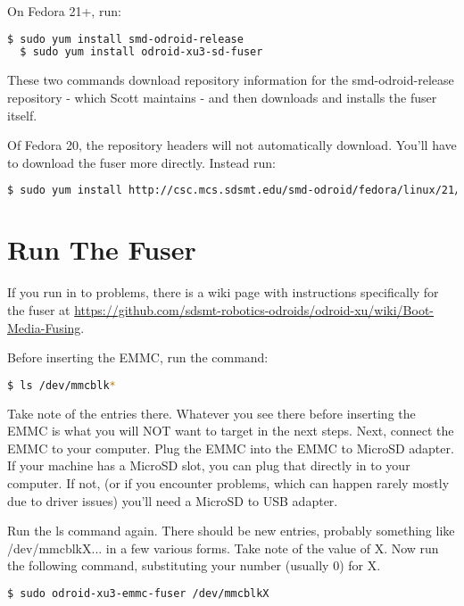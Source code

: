 On Fedora 21+, run:
\begin{lstlisting}[language=bash]
  $ sudo yum install smd-odroid-release
  $ sudo yum install odroid-xu3-sd-fuser
\end{lstlisting}

These two commands download repository information for the smd-odroid-release repository - which Scott maintains - and then downloads and installs the fuser itself.

Of Fedora 20, the repository headers will not automatically download. You'll have to download the fuser more directly. Instead run:

\begin{lstlisting}[language=bash]
  $ sudo yum install http://csc.mcs.sdsmt.edu/smd-odroid/fedora/linux/21/x86_64/odroid-xu3-sd-fuser-0.2.0-1.fc21.noarch.rpm
\end{lstlisting}

\section{Run The Fuser}

If you run in to problems, there is a wiki page with instructions specifically for the fuser at \url{https://github.com/sdsmt-robotics-odroids/odroid-xu/wiki/Boot-Media-Fusing}.

Before inserting the EMMC, run the command:

\begin{lstlisting}[language=bash]
  $ ls /dev/mmcblk*
\end{lstlisting}

Take note of the entries there. Whatever you see there before inserting the EMMC is what you will NOT want to target in the next steps. Next, connect the EMMC to your computer. Plug the EMMC into the EMMC to MicroSD adapter. If your machine has a MicroSD slot, you can plug that directly in to your computer. If not, (or if you encounter problems, which can happen rarely mostly due to driver issues) you'll need a MicroSD to USB adapter.

Run the ls command again. There should be new entries, probably something like /dev/mmcblkX... in a few various forms. Take note of the value of X. Now run the following command, substituting your number (usually 0) for X.

\begin{lstlisting}[language=bash]
  $ sudo odroid-xu3-emmc-fuser /dev/mmcblkX
\end{lstlisting}

